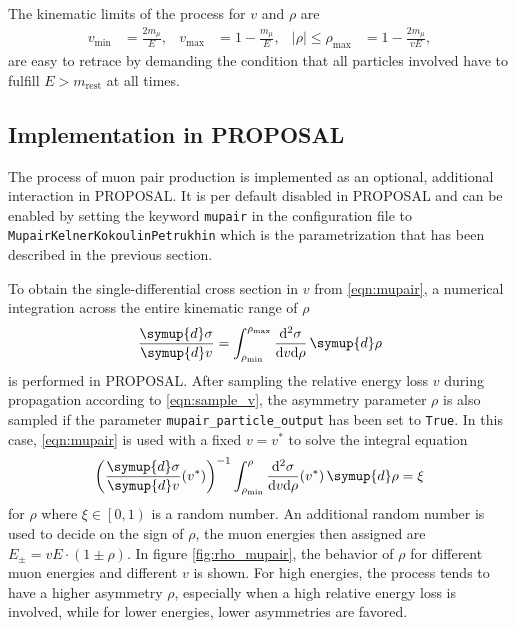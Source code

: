 The kinematic limits of the process for $v$ and $\rho$ are
%
\begin{align}
    v_\text{min} &= \frac{2 m_{\mu}}{E}, & v_\text{max} &= 1 - \frac{m_{\mu}}{E}, & \left| \rho \right| \leq \rho_{\text{max}} &= 1 - \frac{2 m_{\mu}}{v E},
\end{align}
%
are easy to retrace by demanding the condition that all particles involved have to fulfill $E > m_{\text{rest}}$ at all times.

\subsection{Implementation in PROPOSAL}
\label{sec:mupair_implementation}

\begin{sloppypar}
The process of muon pair production is implemented as an optional, additional interaction in PROPOSAL.
It is per default disabled in PROPOSAL and can be enabled by setting the keyword \texttt{mupair} in the configuration file to \texttt{MupairKelnerKokoulinPetrukhin} which is the parametrization that has been described in the previous section.
\end{sloppypar}

\begin{sloppypar}
To obtain the single-differential cross section in $v$ from \eqref{eqn:mupair}, a numerical integration across the entire kinematic range of $\rho$
%
\begin{equation}
    \frac{\symup{d}\sigma}{\symup{d}v} = \int_{\rho_{\text{min}}}^{\rho_{\text{max}}} \frac{\mathrm{d}^2\sigma}{\mathrm{d}v \mathrm{d}\rho} \, \symup{d}\rho
\end{equation}
%
is performed in PROPOSAL.
After sampling the relative energy loss $v$ during propagation according to \eqref{eqn:sample_v}, the asymmetry parameter $\rho$ is also sampled if the parameter \texttt{mupair\_particle\_output} has been set to \texttt{True}.
In this case, \eqref{eqn:mupair} is used with a fixed $v = v^{\ast}$ to solve the integral equation
\begin{equation}
    \left( \frac{\symup{d}\sigma}{\symup{d}v}(v^{\ast}) \right)^{-1} \int_{\rho_\text{min}}^{\rho} \frac{\mathrm{d}^2\sigma}{\mathrm{d}v \mathrm{d}\rho}(v^{\ast}) \, \symup{d}\rho = \xi
\end{equation}
for $\rho$ where $\xi \in \left[0,1\right)$ is a random number.
An additional random number is used to decide on the sign of $\rho$, the muon energies then assigned are $E_{\pm} = v E \cdot(1 \pm \rho)$.
In figure \ref{fig:rho_mupair}, the behavior of $\rho$ for different muon energies and different $v$ is shown.
For high energies, the process tends to have a higher asymmetry $\rho$, especially when a high relative energy loss is involved, while for lower energies, lower asymmetries are favored.
\end{sloppypar}

